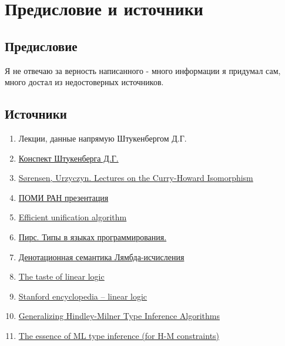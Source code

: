 \section{Предисловие и источники}
\label{sec-1}
\subsection{Предисловие}
\label{sec-1-1}
Я не отвечаю за верность написанного - много информации я придумал сам, много
достал из недостоверных источников.
\subsection{Источники}
\begin{enumerate}
  \item Лекции, данные напрямую Штукенбергом Д.Г.
  \item \href{https://github.com/shd/tt2014/blob/master/conspect.pdf}{Конспект Штукенберга Д.Г.}
  \item \href{http://disi.unitn.it/~bernardi/RSISE11/Papers/curry-howard.pdf}{Sørensen, Urzyczyn. Lectures on the Curry-Howard Isomorphism}
  \item \href{http://www.compsciclub.ru/csclub/sites/default/files/slides/20110313_systems_of_typed_lambda_calculi_moskvin_lecture06.pdf}{ПОМИ РАН презентация}
  \item \href{http://www.nsl.com/misc/papers/martelli-montanari.pdf}{Efficient unification algorithm}
  \item \href{http://starling.rinet.ru/~goga/tapl/tapl.pdf}{Пирс. Типы в языках программирования.}
  \item \href{http://math.nsc.ru/~asm256/lambda/LambdaDec2012.pdf}{Денотационная семантика Лямбда-исчисления}
  \item \href{http://r.duckduckgo.com/l/?kh=-1\&uddg=http://homepages.inf.ed.ac.uk/wadler/papers/lineartaste/lineartaste-revised.pdf}{The taste of linear logic}
  \item \href{http://plato.stanford.edu/entries/logic-linear/}{Stanford encyclopedia -- linear logic}
  \item \href{http://webdoc.sub.gwdg.de/ebook/serien/ah/UU-CS/2002-031.pdf}{Generalizing Hindley-Milner Type Inference Algorithms}
  \item \href{http://gallium.inria.fr/~fpottier/publis/emlti-final.pdf}{The essence of ML type inference (for H-M constraints)}
\end{enumerate}